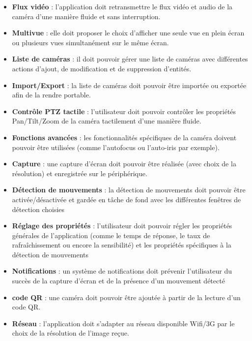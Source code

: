 \begin{itemize}
  \item \textbf{Flux vidéo} : l'application doit retransmettre le flux vidéo et
  audio de la caméra d'une manière fluide et sans interruption.
  \item \textbf{Multivue} : elle doit proposer le choix d'afficher une seule vue en
  plein écran ou plusieurs vues simultanément sur le même écran.
  \item \textbf{Liste de caméras} : il doit pouvoir gérer une liste de caméras avec
  différentes actions d'ajout, de modification et de suppression d'entités.
  \item \textbf{Import/Export} : la liste de caméras doit pouvoir être importée ou
  exportée afin de la rendre portable.
  \item \textbf{Contrôle PTZ tactile} : l'utilisateur doit pouvoir contrôler les
  propriétés Pan/Tilt/Zoom de la caméra tactilement d'une manière fluide.
  \item \textbf{Fonctions avancées} : les fonctionnalités spécifiques de la caméra
  doivent pouvoir être utilisées (comme l'autofocus ou l'auto-iris par exemple).
  \item \textbf{Capture} : une capture d'écran doit pouvoir être réalisée (avec
  choix de la résolution) et enregistrée sur le périphérique.
  \item \textbf{Détection de mouvements} : la détection de mouvements doit pouvoir
  être activée/désactivée et gardée en tâche de fond avec les différentes fenêtres de détection choisies
  \item \textbf{Réglage des propriétés} : l'utilisateur doit pouvoir régler les
  propriétés générales de l'application (comme le temps de réponse, le taux de rafraîchissement ou encore la sensibilité) et les propriétés spécifiques à la détection de mouvements
  \item \textbf{Notifications} : un système de notifications doit prévenir
  l'utilisateur du succès de la capture d'écran et de la présence d'un mouvement détecté
  \item \textbf{code QR} : une caméra doit pouvoir être ajoutée à partir de la
  lecture d'un code QR.
  \item \textbf{Réseau} : l'application doit s'adapter au réseau disponible Wifi/3G
  par le choix de la résolution de l'image reçue.
\end{itemize}

